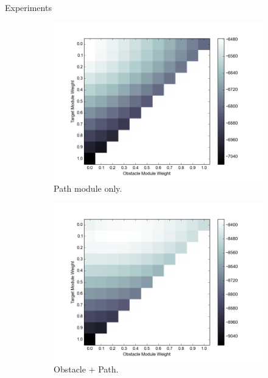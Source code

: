 \documentclass[final]{beamer}
\begin{document}
\begin{frame}{}
\begin{textblock}{86}
\begin{block}{Experiments}
\begin{figure}[h]
\centering
\begin{subfigure}[b]{0.24\textwidth}
\includegraphics[width=\textwidth]{objValuesTask1.png}
\caption{Path module only.}
\end{subfigure}
\begin{subfigure}[b]{0.24\textwidth}
\includegraphics[width=\textwidth]{objValuesTask2.png}
\caption{Obstacle + Path. }
\end{subfigure}
\begin{subfigure}[b]{0.24\textwidth}

\end{subfigure}
\end{figure}
\end{block}
\end{textblock}
\end{frame}
\end{document}
